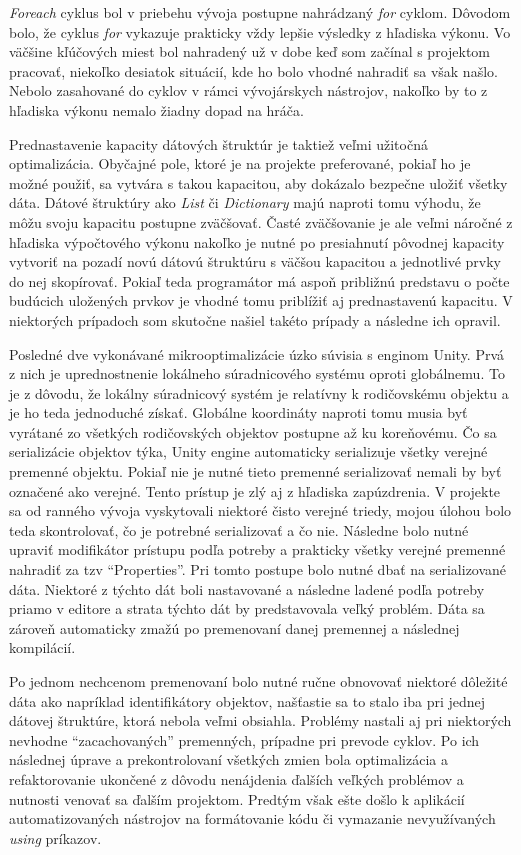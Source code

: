 \documentclass[slovak, bachelorpractice]{diploma}
\begin{document}
\textit{Foreach} cyklus bol v priebehu vývoja postupne nahrádzaný \textit{for} cyklom. Dôvodom bolo, že cyklus \textit{for} vykazuje prakticky vždy lepšie výsledky z hľadiska výkonu. Vo väčšine kľúčových miest bol nahradený už v dobe keď som začínal s projektom pracovať, niekoľko desiatok situácií, kde ho bolo vhodné nahradiť sa však našlo.  Nebolo zasahované do cyklov v rámci vývojárskych nástrojov, nakoľko by to z hľadiska výkonu nemalo žiadny dopad na hráča.

Prednastavenie kapacity dátových štruktúr je taktiež veľmi užitočná optimalizácia. Obyčajné pole, ktoré je na projekte preferované, pokiaľ ho je možné použiť, sa vytvára s takou kapacitou, aby dokázalo bezpečne uložiť všetky dáta. Dátové štruktúry ako \textit{List} či \textit{Dictionary} majú naproti tomu výhodu, že môžu svoju kapacitu postupne zväčšovať. Časté zväčšovanie je ale veľmi náročné z hľadiska výpočtového výkonu nakoľko je nutné po presiahnutí pôvodnej kapacity vytvoriť na pozadí novú dátovú štruktúru s väčšou kapacitou a jednotlivé prvky do nej skopírovať. Pokiaľ teda programátor má aspoň približnú predstavu o počte budúcich uložených prvkov je vhodné tomu priblížiť aj prednastavenú kapacitu. V niektorých prípadoch som skutočne našiel takéto prípady a následne ich opravil.

Posledné dve vykonávané mikrooptimalizácie úzko súvisia s enginom Unity. Prvá z nich je uprednostnenie lokálneho súradnicového systému oproti globálnemu. To je z dôvodu, že lokálny súradnicový systém je relatívny k rodičovskému objektu a je ho teda jednoduché získať. Globálne koordináty naproti tomu musia byť vyrátané zo všetkých rodičovských objektov postupne až ku koreňovému. Čo sa serializácie objektov týka, Unity engine automaticky serializuje všetky verejné premenné objektu. Pokiaľ nie je nutné tieto premenné serializovať nemali by byť označené ako verejné. Tento prístup je zlý aj z hľadiska zapúzdrenia. V projekte sa od ranného vývoja vyskytovali niektoré čisto verejné triedy, mojou úlohou bolo teda skontrolovať, čo je potrebné serializovať a čo nie. Následne bolo nutné upraviť modifikátor prístupu podľa potreby a prakticky všetky verejné premenné nahradiť za tzv \enquote{Properties}. Pri tomto postupe bolo nutné dbať na serializované dáta. Niektoré z týchto dát boli nastavované a následne ladené podľa potreby priamo v editore a strata týchto dát by predstavovala veľký problém. Dáta sa zároveň automaticky zmažú po premenovaní danej premennej a následnej kompilácií. 

Po jednom nechcenom premenovaní bolo nutné ručne obnovovať niektoré dôležité dáta ako napríklad identifikátory objektov, našťastie sa to stalo iba pri jednej dátovej štruktúre, ktorá nebola veľmi obsiahla. Problémy nastali aj pri niektorých nevhodne \enquote{zacachovaných} premenných, prípadne pri prevode cyklov. Po ich následnej úprave a prekontrolovaní všetkých zmien bola optimalizácia a refaktorovanie ukončené z dôvodu nenájdenia ďalších veľkých problémov a nutnosti venovať sa ďalším projektom. Predtým však ešte došlo k aplikácií automatizovaných nástrojov na formátovanie kódu či vymazanie nevyužívaných \textit{using} príkazov.
\end{document}
